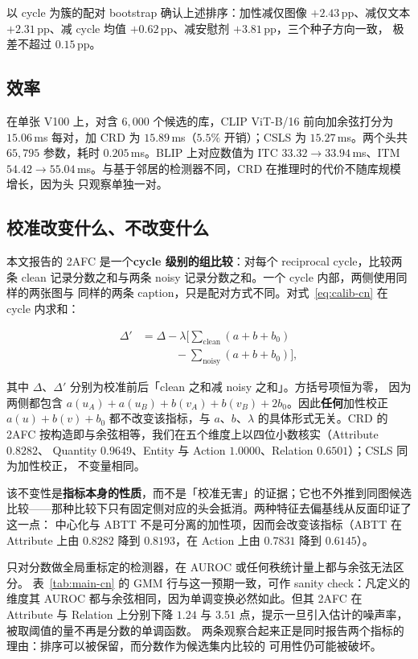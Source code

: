 \documentclass[10pt,twocolumn,a4paper]{ctexart}
\begin{document}
以 cycle 为簇的配对 bootstrap 确认上述排序：加性减仅图像 $+2.43$\,pp、减仅文本
$+2.31$\,pp、减 cycle 均值 $+0.62$\,pp、减安慰剂 $+3.81$\,pp，三个种子方向一致，
极差不超过 $0.15$\,pp。

\subsection{效率}
在单张 V100 上，对含 $6{,}000$ 个候选的库，CLIP ViT-B/16 前向加余弦打分为 $15.06$\,ms
每对，加 CRD 为 $15.89$\,ms（$5.5\%$ 开销）；CSLS 为 $15.27$\,ms。两个头共 $65{,}795$
参数，耗时 $0.205$\,ms。BLIP 上对应数值为 ITC $33.32\to33.94$\,ms、ITM
$54.42\to55.04$\,ms。与基于邻居的检测器不同，CRD 在推理时的代价不随库规模增长，因为头
只观察单独一对。

\subsection{校准改变什么、不改变什么}
\label{sec:analysis-cn}
本文报告的 2AFC 是一个\textbf{cycle 级别的组比较}：对每个 reciprocal cycle，比较两条
clean 记录分数之和与两条 noisy 记录分数之和。一个 cycle 内部，两侧使用同样的两张图与
同样的两条 caption，只是配对方式不同。对式~\eqref{eq:calib-cn} 在 cycle 内求和：

\begin{equation}
\begin{aligned}
\Delta' &= \Delta
- \lambda\Big[\textstyle\sum_{\text{clean}}(a+b+b_0)\\
&\qquad\quad - \textstyle\sum_{\text{noisy}}(a+b+b_0)\Big],
\end{aligned}
\end{equation}

其中 $\Delta$、$\Delta'$ 分别为校准前后「clean 之和减 noisy 之和」。方括号项恒为零，
因为两侧都包含 $a(u_A)+a(u_B)+b(v_A)+b(v_B)+2b_0$。因此\textbf{任何}加性校正
$a(u)+b(v)+b_0$ 都不改变该指标，与 $a$、$b$、$\lambda$ 的具体形式无关。CRD 的 2AFC
按构造即与余弦相等，我们在五个维度上以四位小数核实（Attribute $0.8282$、
Quantity $0.9649$、Entity 与 Action $1.0000$、Relation $0.6501$）；CSLS 同为加性校正，
不变量相同。

该不变性是\textbf{指标本身的性质}，而不是「校准无害」的证据；它也不外推到同图候选
比较——那种比较下只有固定侧对应的头会抵消。两种特征去偏基线从反面印证了这一点：
中心化与 ABTT 不是可分离的加性项，因而会改变该指标（ABTT 在 Attribute 上由 $0.8282$
降到 $0.8193$，在 Action 上由 $0.7831$ 降到 $0.6145$）。

只对分数做全局重标定的检测器，在 AUROC 或任何秩统计量上都与余弦无法区分。
表~\ref{tab:main-cn} 的 GMM 行与这一预期一致，可作 sanity check：凡定义的维度其 AUROC
都与余弦相同，因为单调变换必然如此。但其 2AFC 在 Attribute 与 Relation 上分别下降
$1.24$ 与 $3.51$ 点，提示一旦引入估计的噪声率，被取阈值的量不再是分数的单调函数。
两条观察合起来正是同时报告两个指标的理由：排序可以被保留，而分数作为候选集内比较的
可用性仍可能被破坏。
\end{document}
